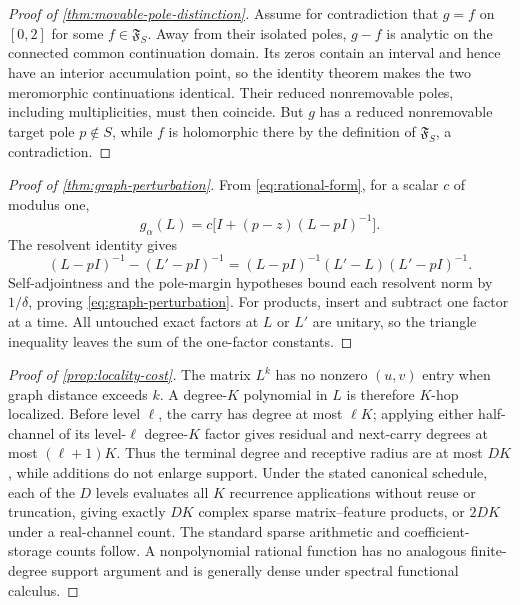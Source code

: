 \begin{proof}[Proof of \cref{thm:movable-pole-distinction}]
Assume for contradiction that $g=f$ on $[0,2]$ for some
$f\in\mathfrak F_S$.  Away from their isolated poles, $g-f$ is analytic on
the connected common continuation domain.  Its zeros contain an interval and
hence have an interior accumulation point, so the identity theorem makes the
two meromorphic continuations identical.  Their reduced nonremovable poles,
including multiplicities, must then coincide.  But $g$ has a reduced
nonremovable target pole
$p\notin S$, while $f$ is holomorphic there by the definition of
$\mathfrak F_S$, a contradiction.
\end{proof}

\begin{proof}[Proof of \cref{thm:graph-perturbation}]
From \cref{eq:rational-form}, for a scalar $c$ of modulus one,
\begin{equation}
 g_\alpha(L)=c\bigl[I+(p-z)(L-pI)^{-1}\bigr].
\end{equation}
The resolvent identity gives
\begin{equation}
 (L-pI)^{-1}-(L'-pI)^{-1}
 =(L-pI)^{-1}(L'-L)(L'-pI)^{-1}.
\end{equation}
Self-adjointness and the pole-margin hypotheses bound each resolvent norm by
$1/\delta$, proving \cref{eq:graph-perturbation}.  For products, insert and
subtract one factor at a time.  All untouched exact factors at $L$ or $L'$
are unitary, so the triangle inequality leaves the sum of the one-factor
constants.
\end{proof}

\begin{proof}[Proof of \cref{prop:locality-cost}]
The matrix $L^k$ has no nonzero $(u,v)$ entry when graph distance exceeds
$k$.  A degree-$K$ polynomial in $L$ is therefore $K$-hop localized.
Before level $\ell$, the carry has degree at most $\ell K$; applying either
half-channel of its level-$\ell$ degree-$K$ factor gives residual and next-carry
degrees at most $(\ell+1)K$.  Thus the terminal degree and receptive radius are
at most $DK$, while additions do not enlarge support.  Under the stated
canonical schedule, each of the $D$ levels evaluates all $K$ recurrence
applications without reuse or truncation, giving exactly $DK$ complex sparse
matrix--feature products, or $2DK$ under a real-channel count.  The standard
sparse arithmetic and coefficient-storage counts follow.  A nonpolynomial
rational function has no analogous finite-degree support argument and is
generally dense under spectral functional calculus.
\end{proof}

